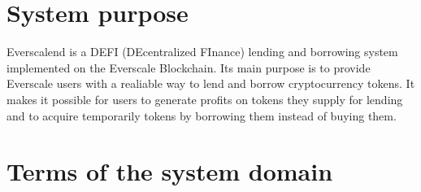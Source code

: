 

\section{System purpose}

Everscalend is a DEFI (DEcentralized FInance) lending and borrowing system implemented on the Everscale Blockchain. Its main purpose is to provide Everscale users with a realiable way to lend and borrow cryptocurrency tokens. It makes it possible for users to generate profits on tokens they supply for lending and to acquire temporarily tokens by borrowing them instead of buying them.

\section{Terms of the system domain}


